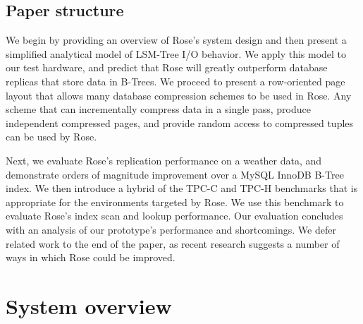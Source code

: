 \documentclass{vldb}
\newcommand{\rows}{Rose\xspace}
\newcommand{\rowss}{Rose's\xspace}
\begin{document}


\subsection{Paper structure}

We begin by providing an overview of \rowss system design and then
present a simplified analytical model of LSM-Tree I/O behavior.  We
apply this model to our test hardware, and predict that \rows will
greatly outperform database replicas that store data in B-Trees.  We
proceed to present a row-oriented page layout that allows many
database compression schemes to be used in \rows.  Any scheme that can
incrementally compress data in a single pass, produce independent
compressed pages, and provide random access to compressed tuples can be used by \rows.

Next, we
evaluate \rowss replication performance on a weather data, and
demonstrate orders of magnitude improvement over
a MySQL InnoDB B-Tree index.  We then introduce a hybrid of the
TPC-C and TPC-H benchmarks that is appropriate for the environments
targeted by \rows.  We use this benchmark to evaluate \rowss index scan and lookup performance.  Our evaluation concludes
with an analysis of our prototype's performance and shortcomings.  We
defer related work to the end of the paper, as recent research
suggests a number of ways in which \rows could be improved.

\section{System overview}
\end{document}
